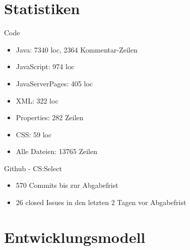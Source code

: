 \documentclass[xcolor=dvipsnames]{beamer}
\begin{document}
\section{Statistiken}
\begin{frame}{Code}
  \begin{itemize}
    \item Java: 7340 loc, 2364 Kommentar-Zeilen \\
    \item JavaScript: 974 loc \\
    \item JavaServerPages: 405 loc \\
    \item XML: 322 loc \\
    \item Properties: 282 Zeilen \\
    \item CSS: 59 loc \\
    \item Alle Dateien: 13765 Zeilen \\
  \end{itemize}
\end{frame}
\begin{frame}{Github - CS:Select}
  \begin{itemize}
    \item 570 Commits bis zur Abgabefrist \\
    \item 26 closed Issues in den letzten 2 Tagen vor Abgabefrist \\
  \end{itemize}
\end{frame}

\section{Entwicklungsmodell}
\end{document}
